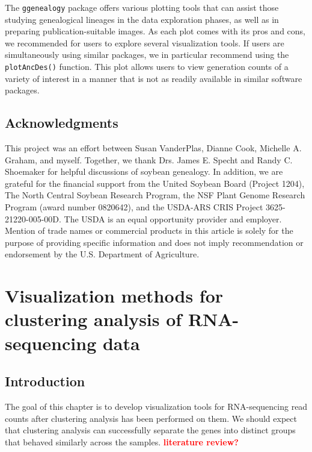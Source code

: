 \documentclass[11pt,a4paper,oldfontcommands,openany]{memoir}
\numberwithin{equation}{section} %
\newcommand{\code}[1]{{\texttt{#1}}}
\newcommand{\pkg}[1]{{\texttt{#1}}}
\begin{document}
The \pkg{ggenealogy} package offers various plotting tools that can assist those studying genealogical lineages in the data exploration phases, as well as in preparing publication-suitable images. As each plot comes with its pros and cons, we recommended for users to explore several visualization tools. If users are simultaneously using similar packages, we in particular recommend using the \code{plotAncDes()} function. This plot allows users to view generation counts of a variety of interest in a manner that is not as readily available in similar software packages.

\section{Acknowledgments}

This project was an effort between Susan VanderPlas, Dianne Cook, Michelle A. Graham, and myself. Together, we  thank Drs. James E. Specht and Randy C. Shoemaker for helpful discussions of soybean genealogy. In addition, we are grateful for the financial support from the United Soybean Board (Project 1204), The North Central Soybean Research Program, the NSF Plant Genome Research Program (award number 0820642), and the USDA-ARS CRIS Project 3625-21220-005-00D. The USDA is an equal opportunity provider and employer. Mention of trade names or commercial products in this article is solely for the purpose of providing specific information and does not imply recommendation or endorsement by the U.S. Department of Agriculture.











\chapter{Visualization methods for clustering analysis of RNA-sequencing data}

\section{Introduction}

The goal of this chapter is to develop visualization tools for RNA-sequencing read counts after clustering analysis has been performed on them. We should expect that clustering analysis can successfully separate the genes into distinct groups that behaved similarly across the samples. \textbf{\textcolor{Red}{literature review?}}
\end{document}
